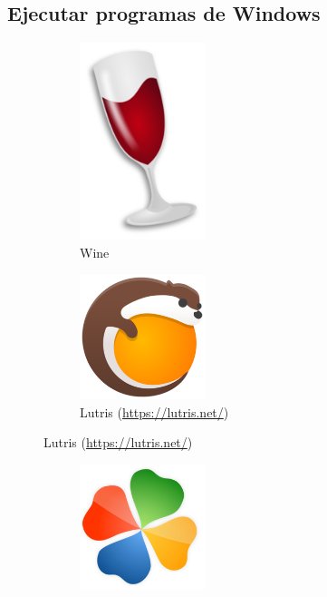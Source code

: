 \documentclass[aspectratio=43]{beamer}
\begin{document}
    \subsection{Ejecutar programas de Windows}
    \begin{frame}{\secname}{\subsecname}
        \begin{figure}
            \centering
            \begin{subfigure}{.4\textwidth}
                \centering
                \includegraphics[width=0.4\textwidth]{img/wine.png}
                \caption*{Wine}
            \end{subfigure}
            \pause
            \begin{subfigure}{.4\textwidth}
                \centering
                \includegraphics[width=0.4\textwidth]{img/lutris.png}
                \caption*{Lutris (\url{https://lutris.net/})}
            \end{subfigure}
            \pause
        \end{figure}
        \begin{figure}
            \centering
            \begin{subfigure}{.4\textwidth}
                \centering
                \includegraphics[width=0.4\textwidth]{img/playonlinux.png}

\end{subfigure}
\end{figure}
\end{frame}
\end{document}
